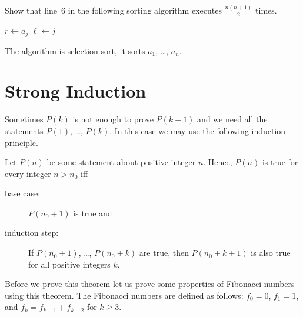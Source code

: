 \begin{exercise}
  Show that line~6 in the following sorting algorithm executes
  $\frac{n (n + 1)}{2}$ times.
  \begin{algorithm}
    \begin{algorithmic}[1]
              \State $r \gets a_j$
              \State $\ell \gets j$
            \EndIf
          \EndFor
        \EndFor
      \EndFunction
    \end{algorithmic}
    \caption{The algorithm is selection sort, it sorts $a_1$, \dots, $a_n$.}
  \end{algorithm}
\end{exercise}



\section{Strong Induction}

Sometimes $P(k)$ is not enough to prove $P(k + 1)$ and we need all the
statements $P(1)$, \dots, $P(k)$. In this case we may use the following
induction  principle.

\begin{theorem}
\label{theorem:strong-induction}
  Let $P(n)$ be some statement about positive integer $n$.
  Hence, $P(n)$ is true for every integer $n > n_0$ iff
  \begin{description}
    \item[base case:] $P(n_0 + 1)$ is true and
    \item[induction step:] If $P(n_0 + 1)$, \dots, $P(n_0 + k)$ are true, then
      $P(n_0 + k + 1)$ is also true for all positive integers $k$.
  \end{description}
\end{theorem}

Before we prove this theorem let us prove some properties of Fibonacci numbers
using this theorem. The Fibonacci numbers are defined as follows:
$f_0 = 0$, $f_1 = 1$, and $f_k = f_{k - 1} + f_{k - 2}$ for $k \ge 3$.

